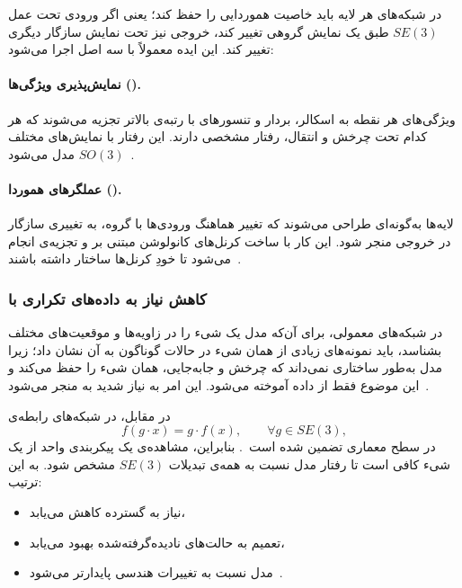 \documentclass{article}
\begin{document}
در شبکه‌های  هر لایه باید خاصیت هموردایی را حفظ کند؛ یعنی اگر ورودی تحت عمل \(SE(3)\) طبق یک نمایش گروهی تغییر کند، خروجی نیز تحت نمایش سازگار دیگری تغییر کند. این ایده معمولاً با سه اصل اجرا می‌شود:

\paragraph{نمایش‌پذیری ویژگی‌ها ().}

ویژگی‌های هر نقطه به اسکالر، بردار و تنسورهای با رتبه‌ی بالاتر تجزیه می‌شوند که هر کدام تحت چرخش و انتقال، رفتار مشخصی دارند. این رفتار با نمایش‌های مختلف \(SO(3)\) مدل می‌شود~\cite{thomas2018tensor,fuchs2020se}.

\paragraph{عملگرهای هموردا ().}

لایه‌ها به‌گونه‌ای طراحی می‌شوند که تغییر هماهنگ ورودی‌ها با گروه، به تغییری سازگار در خروجی منجر شود. این کار با ساخت کرنل‌های کانولوشن مبتنی بر  و تجزیه‌ی  انجام می‌شود تا خودِ کرنل‌ها ساختار  داشته باشند~\cite{thomas2018tensor,bronstein2021geometric}.




\subsubsection{کاهش نیاز به داده‌های تکراری با }

در شبکه‌های معمولی، برای آن‌که مدل یک شیء را در زاویه‌ها و موقعیت‌های مختلف بشناسد، باید نمونه‌های زیادی از همان شیء در حالات گوناگون به آن نشان داد؛ زیرا مدل به‌طور ساختاری نمی‌داند که چرخش و جابه‌جایی، همان شیء را حفظ می‌کند و این موضوع فقط از داده آموخته می‌شود. این امر به نیاز شدید به  منجر می‌شود~\cite{goodfellow2016deep}.

در مقابل، در شبکه‌های  رابطه‌ی
\begin{equation}
	f(g \cdot x) = g \cdot f(x), \qquad \forall g \in SE(3),
\end{equation}
در سطح معماری تضمین شده است~\cite{cohen2016group,thomas2018tensor,fuchs2020se,satorras2021en,bronstein2021geometric}. بنابراین، مشاهده‌ی یک پیکربندی واحد از یک شیء کافی است تا رفتار مدل نسبت به همه‌ی تبدیلات \(SE(3)\) مشخص شود. به این ترتیب:
\begin{itemize}
	\item نیاز به  گسترده کاهش می‌یابد،
	\item تعمیم به حالت‌های نادیده‌گرفته‌شده بهبود می‌یابد،
	\item مدل نسبت به تغییرات هندسی پایدارتر می‌شود~\cite{thomas2018tensor,fuchs2020se,bronstein2021geometric}.
\end{itemize}
\end{document}
